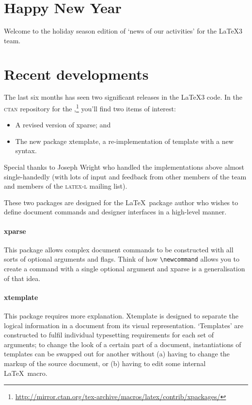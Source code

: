 \documentclass{ltnews}
\begin{document}
\maketitle
\raisefirstsection

\section{Happy New Year}

Welcome to the holiday season edition of `news of our activities' for
the \LaTeX3 team.

\section{Recent developments}

The last six months has seen two significant releases in the \LaTeX3 code.
In the \textsc{ctan} repository for the ,\footnote{\url{http://mirror.ctan.org/tex-archive/macros/latex/contrib/xpackages/}} you'll find two items of interest:
\begin{itemize}
\item A revised version of \textsf{xparse}; and
\item The new package \textsf{xtemplate}, a re-implementation of \textsf{template} with a new syntax.
\end{itemize}
Special thanks to Joseph Wright who handled the implementations above almost single-handedly (with lots of input and feedback from other members of the team and members of the \textsc{latex-l} mailing list).

These two packages are designed for the \LaTeX\ package author who wishes to define document commands and designer interfaces in a high-level manner.

\paragraph{\textsf{xparse}}
This package allows complex document commands to be constructed with all sorts of optional arguments and flags. Think of how \verb|\newcommand| allows you to create a command with a single optional argument and \textsf{xparse} is a generalisation of that idea.

\paragraph{\textsf{xtemplate}}
This package requires more explanation.
\textsf{Xtemplate} is designed to separate the logical information in a
document from its visual representation. `Templates' are constructed to fulfil
individual typesetting requirements for each set of arguments; to change
the look of a certain part of a document, instantiations of templates can be
swapped out for another without (a) having to change the markup of the source
document, or (b) having to edit some internal \LaTeX\ macro.
\end{document}

